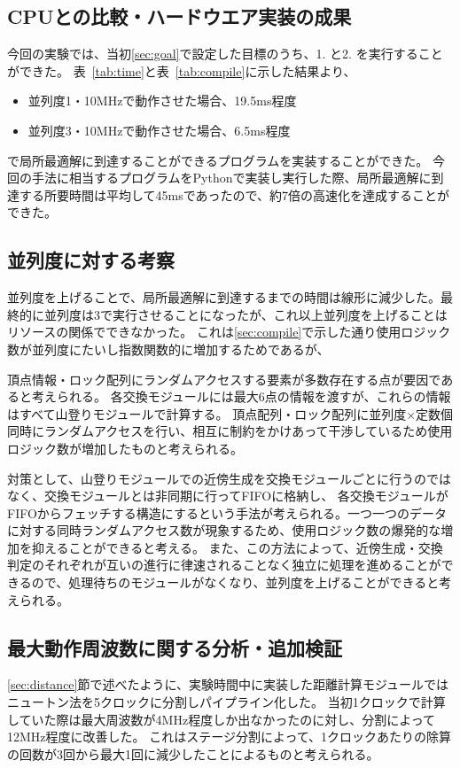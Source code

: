 \subsection{CPUとの比較・ハードウエア実装の成果}
今回の実験では、当初\ref{sec:goal}で設定した目標のうち、1. と2. を実行することができた。
表~\ref{tab:time}と表~\ref{tab:compile}に示した結果より、
\begin{itemize}
    \item 並列度1・10MHzで動作させた場合、19.5ms程度
    \item 並列度3・10MHzで動作させた場合、6.5ms程度
\end{itemize}
で局所最適解に到達することができるプログラムを実装することができた。
今回の手法に相当するプログラムをPythonで実装し実行した際、局所最適解に到達する所要時間は平均して45msであったので、約7倍の高速化を達成することができた。

\subsection{並列度に対する考察}
並列度を上げることで、局所最適解に到達するまでの時間は線形に減少した。最終的に並列度は3で実行させることになったが、これ以上並列度を上げることはリソースの関係でできなかった。
これは\ref{sec:compile}で示した通り使用ロジック数が並列度にたいし指数関数的に増加するためであるが、

頂点情報・ロック配列にランダムアクセスする要素が多数存在する点が要因であると考えられる。
各交換モジュールには最大6点の情報を渡すが、これらの情報はすべて山登りモジュールで計算する。
頂点配列・ロック配列に並列度×定数個同時にランダムアクセスを行い、相互に制約をかけあって干渉しているため使用ロジック数が増加したものと考えられる。

対策として、山登りモジュールでの近傍生成を交換モジュールごとに行うのではなく、交換モジュールとは非同期に行ってFIFOに格納し、
各交換モジュールがFIFOからフェッチする構造にするという手法が考えられる。一つ一つのデータに対する同時ランダムアクセス数が現象するため、使用ロジック数の爆発的な増加を抑えることができると考える。
また、この方法によって、近傍生成・交換判定のそれぞれが互いの進行に律速されることなく独立に処理を進めることができるので、処理待ちのモジュールがなくなり、並列度を上げることができると考えられる。

\subsection{最大動作周波数に関する分析・追加検証}
\ref{sec:distance}節で述べたように、実験時間中に実装した距離計算モジュールではニュートン法を5クロックに分割しパイプライン化した。
当初1クロックで計算していた際は最大周波数が4MHz程度しか出なかったのに対し、分割によって12MHz程度に改善した。
これはステージ分割によって、1クロックあたりの除算の回数が3回から最大1回に減少したことによるものと考えられる。

